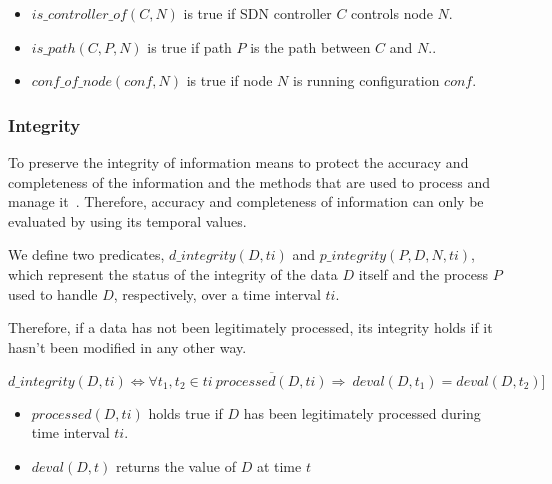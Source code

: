 \begin{itemize}
\item $is\_controller\_of(C,N)$ is true if SDN controller $C$ controls node $N$.  
\item $is\_path(C,P,N)$ is true if path $P$ is the path between $C$ and $N$..
\item $conf\_of\_node(conf, N)$ is true if node $N$ is running configuration $conf$.
\end{itemize}

\subsubsection{Integrity}
\label{sec:prop-int}
 To preserve the integrity of information means to protect the accuracy and completeness of the information and the methods that are used to process and manage it~\cite{ISO/IEC270012013}.
Therefore, accuracy and completeness of information can only be evaluated by using its temporal values.

We define two predicates, $d\_integrity(D,ti)$ and $p\_integrity(P,D,N,ti)$, which represent the status of the integrity of the data $D$ itself and the process $P$ used to handle $D$, respectively, over a time interval $ti$. 

Therefore, if a data has not been legitimately processed, its integrity holds if it hasn't been modified in any other way.
\begin{myformula}
$d\_integrity(D,ti) \Leftrightarrow \forall t_1,t_2\in ti ~ \overline{processed(D, ti)} \Rightarrow 
~deval(D,t_1)=deval(D,t_2)]$ 
\end{myformula}

\begin{itemize}
\item $processed(D, ti)$ holds true if $D$ has been legitimately processed during time interval $ti$.
\item $deval(D,t)$ returns the value of $D$ at time $t$

\end{itemize}

